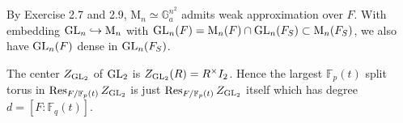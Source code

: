 \begin{problem}
By Exercise 2.7 and 2.9, $\mathrm{M}_{n} \simeq \mathbb{G}_{a}^{n^{2}}$ admits weak approximation over $F$.
With embedding $\operatorname{\mathrm{GL}}_{n} \hookrightarrow \mathrm{M}_{n}$ with $\operatorname{\mathrm{GL}}_{n}(F) = \mathrm{M}_{n}(F) \cap \operatorname{\mathrm{GL}}_{n}(F_S) \subset \mathrm{M}_{n}(F_{S})$,
we also have $\operatorname{\mathrm{GL}}_{n}(F)$ dense in $\operatorname{\mathrm{GL}}_{n}(F_S)$.
\end{problem}


\begin{problem} \notfinish
\end{problem}
\begin{problem} \notfinish
\end{problem}
\begin{problem} \notfinish
\end{problem}
\begin{problem} \notfinish
\end{problem}
\begin{problem} \notfinish
\end{problem}

\begin{problem} \notfinish
The center $Z_{\operatorname{\mathrm{GL}}_2}$ of $\operatorname{\mathrm{GL}}_2$ is $Z_{\operatorname{\mathrm{GL}}_2}(R) = R^{\times}I_2$.
Hence the largest $\mathbb{F}_{p}(t)$ split torus in $\operatorname{\mathrm{Res}}_{F/\mathbb{F}_{p}(t)}Z_{\operatorname{\mathrm{GL}}_2}$
is just $\operatorname{\mathrm{Res}}_{F/\mathbb{F}_{p}(t)}Z_{\operatorname{\mathrm{GL}}_2}$ itself which has degree $d = [F:\mathbb{F}_q(t)]$.
\end{problem}

\begin{problem} \notfinish
\end{problem}
\begin{problem} \notfinish
\end{problem}

